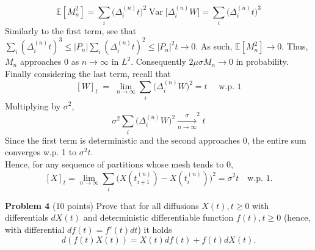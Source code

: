 \documentclass{article}
\begin{document}
{$$\mathbb E[M_n^{2}]=\sum_{i}\bigl(\Delta_i^{(n)}t\bigr)^{2}\operatorname{Var}\!\bigl[\Delta_i^{(n)}W\bigr]
               =\sum_{i}\bigl(\Delta_i^{(n)}t\bigr)^{3}
$$
Similarly to the first term, see that $\sum_{i}(\Delta_i^{(n)}t)^{3}\le|P_n|\sum_{i}(\Delta_i^{(n)}t)^{2}\le|P_n|^{2}t\to0$.
As such, $\mathbb E[M_n^{2}]\to0$.
Thus, $M_n$ approaches 0 as $n\rightarrow \infty$ in $L^{2}$. 
Consequently
$2\mu\sigma M_n\to0$ in probability. \\
Finally considering the last term, recall that 
$$
[W]_t\;=\;\lim_{n\to\infty}\sum_{i}\bigl(\Delta_i^{(n)}W\bigr)^2=t \quad \text{ w.p. 1}
$$
Multiplying by $\sigma^{2}$,
$$
\sigma^{2}\sum_{i}\bigl(\Delta_i^{(n)}W\bigr)^2\xrightarrow[n\to\infty]\sigma^{2}t
$$
Since the first term is deterministic and the second approaches 0, the entire sum converges w.p. 1 to $\sigma^{2}t$. \\
Hence, for any sequence of partitions whose mesh tends to $0$,
$$
[X]_t=\lim_{n\to\infty}\sum_{i}\bigl(X(t_{i+1}^{(n)})-X(t_i^{(n)})\bigr)^{2}
      =\sigma^{2}t \quad\text{w.p. }1.
$$
}


\textbf{Problem 4}   (10 points) Prove that for all diffusions $X(t), t \geq 0$ with differentials $dX(t)$ and deterministic differentiable function $f(t), t \geq 0$ (hence, with differential $df(t) = f'(t)dt$) it holds
$$d(f(t)X(t)) = X(t)df(t) + f(t)dX(t).$$
\end{document}
